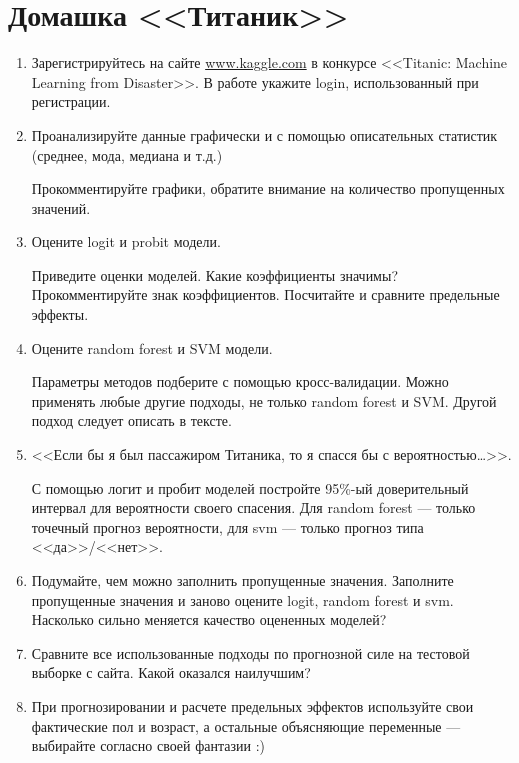 \documentclass[a4paper]{article}
\begin{document}
\pagestyle{empty}
\section*{Домашка <<Титаник>>}


\begin{enumerate}

\item Зарегистрируйтесь на сайте \url{www.kaggle.com}  в конкурсе <<Titanic: Machine Learning from Disaster>>. В работе укажите login, использованный при регистрации.

\item Проанализируйте данные графически и с помощью описательных статистик (среднее, мода, медиана и т.д.)

Прокомментируйте графики, обратите внимание на количество пропущенных значений.

\item Оцените logit и probit модели.

Приведите оценки моделей. Какие коэффициенты значимы? Прокомментируйте знак коэффициентов. Посчитайте и сравните предельные эффекты.

\item Оцените random forest и SVM модели. 

Параметры методов подберите с помощью кросс-валидации. Можно применять любые другие подходы, не только random forest и SVM. Другой подход следует описать в тексте.


\item <<Если бы я был пассажиром Титаника, то я спасся бы с вероятностью\ldots>>. 

С помощью логит и пробит моделей постройте 95\%-ый доверительный интервал для вероятности своего спасения. Для random forest --- только точечный прогноз вероятности, для svm --- только прогноз типа <<да>>/<<нет>>.


\item Подумайте, чем можно заполнить пропущенные значения. Заполните пропущенные значения и заново оцените logit, random forest и svm. Насколько сильно меняется качество оцененных моделей?


\item Сравните все использованные подходы по прогнозной силе на тестовой выборке с сайта. Какой оказался наилучшим?

\item При прогнозировании и расчете предельных эффектов используйте свои фактические пол и возраст, а остальные объясняющие переменные --- выбирайте согласно своей фантазии :)


\end{enumerate}
\end{document}
